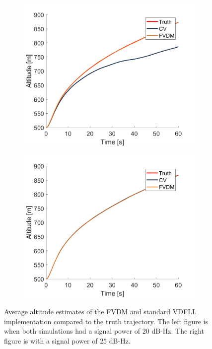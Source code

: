 \begin{figure}[!ht]
    \begin{subfigure}{.45\textwidth}
        \centering
        \includegraphics[width=1\linewidth]{Figures/dynamic/20/ALTITUDE.png}
    \end{subfigure}
    \begin{subfigure}{.45\textwidth}
        \centering
        \includegraphics[width=1\linewidth]{Figures/dynamic/25/ALTITUDE.png}
    \end{subfigure}
    \caption{Average altitude estimates of the FVDM and standard VDFLL implementation compared to the truth trajectory. The left figure is when both simulations had a signal power of \(20\) dB-Hz. The right figure is with a signal power of \(25\) dB-Hz.}\label{fig:Altitude2}
\end{figure}

